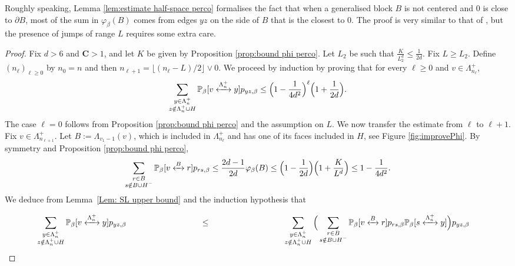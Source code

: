 \documentclass[11pt,a4paper]{article}
\numberwithin{equation}{section}
\theoremstyle{plain}
\theoremstyle{definition}
\newcommand\bfC{\mathbf{C}}
\newcommand{\connect}{\xleftrightarrow}
\begin{document}
Roughly speaking, Lemma \ref{lem:estimate half-space perco} formalises the fact that when a generalised block $B$ is not centered and 0 is close to $\partial B$, most of the sum in $\varphi_\beta(B)$ comes from edges $yz$ on the side of $B$ that is the closest to $0$. The proof is very similar to that of \cite[Lemma~2.7]{DumPan24WSAW}, but the presence of jumps of range $L$ requires some extra care.
\begin{proof} Fix $d>6$ and $\bfC>1$, and let $K$ be given by Proposition \ref{prop:bound phi perco}. Let $L_2$ be such that $\tfrac{K}{L_2^d}\leq \tfrac{1}{2d}$. Fix $L\geq L_2$.
Define $(n_\ell)_{\ell\geq 0}$ by $n_0=n$ and then $n_{\ell+1}=\lfloor (n_\ell-L)/2\rfloor\vee 0$. We proceed by induction by proving that for every $\ell\ge0$ and $v\in \Lambda_{n_\ell}^+$, 
\begin{equation}\label{eq: induction intermediary step}
\sum_{\substack{y \in \Lambda_n^+\\z\notin \Lambda_n^+\cup H}}\mathbb P_\beta[v\connect{\Lambda_n^+\:}y]p_{yz,\beta} \le \Big(1-\frac{1}{4d^2}\Big)^{\ell}\Big(1+\frac{1}{2d}\Big).
\end{equation}
The case $\ell=0$ follows from Proposition \ref{prop:bound phi perco} and the assumption on $L$. We now transfer the estimate from $\ell$ to $\ell+1$. Fix $v\in \Lambda_{n_{\ell+1}}^+$. Let $B:=\Lambda_{v_1-1}(v)$, which is included in $\Lambda_{n_\ell}^+$ and has one of its faces included in $H$, see Figure \ref{fig:improvePhi}. By symmetry and Proposition \ref{prop:bound phi perco},
\begin{equation}\label{eq: proof closer side contributes the most}
\sum_{\substack{r \in B\\s\notin B\cup H^-}}\mathbb P_\beta[v\connect{B\:}r]p_{rs,\beta} \le \frac{2d-1}{2d}\varphi_\beta(B)\le \Big(1-\frac{1}{2d}\Big)\Big(1+\frac{K}{L^d}\Big)\leq 1-\frac{1}{4d^2}.
\end{equation}
We deduce from Lemma~\ref{Lem: SL upper bound} and the induction hypothesis that 
\begin{align*}
\sum_{\substack{y \in \Lambda_n^+\\z\notin \Lambda_n^+\cup H}}\mathbb P_\beta[v\connect{\Lambda_n^+\:}y]p_{yz,\beta}
&\stackrel{\phantom{\eqref{eq: proof closer side contributes the most}}}\le 
\sum_{\substack{y \in \Lambda_n^+\\z\notin \Lambda_n^+\cup H}}\Big(\sum_{\substack{r \in B\\s\notin B\cup H^-}}\mathbb P_\beta[v\connect{B\:}r]p_{rs,\beta}\mathbb P_\beta[s\connect{\Lambda_n^+\:}y]\Big)p_{yz,\beta} 

\end{align*}
\end{proof}
\end{document}
